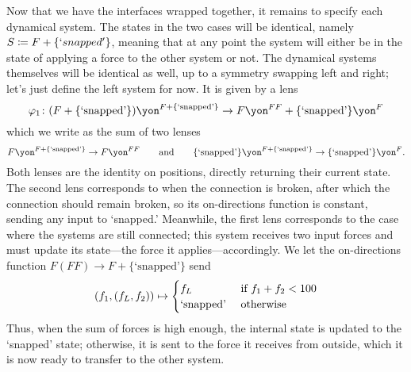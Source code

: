 \documentclass[Book-Poly]{subfiles}
\begin{document}
\begin{example}
Now that we have the interfaces wrapped together, it remains to specify each dynamical system.
The states in the two cases will be identical, namely $S\coloneqq F+\{`snapped'\}$, meaning that at any point the system will either be in the state of applying a force to the other system or not.
The dynamical systems themselves will be identical as well, up to a symmetry swapping left and right; let's just define the left system for now.
It is given by a lens
\[\varphi_1\colon (F+\{\text{`snapped'}\})\yon^{F+\{\text{`snapped'}\}}\to F\yon^{FF}+\{\text{`snapped'}\}\yon^F\]
which we write as the sum of two lenses
\[F\yon^{F+\{\text{`snapped'}\}}\to F\yon^{FF} \qqand \{\text{`snapped'}\}\yon^{F+\{\text{`snapped'}\}}\to\{\text{`snapped'}\}\yon^F.\]
Both lenses are the identity on positions, directly returning their current state.
The second lens corresponds to when the connection is broken, after which the connection should remain broken, so its on-directions function is constant, sending any input to `snapped.'
Meanwhile, the first lens corresponds to the case where the systems are still connected; this system receives two input forces and must update its state---the force it applies---accordingly.
We let the on-directions function $F(FF)\to F+\{\text{`snapped'}\}$ send
\[
(f_1,(f_L,f_2))\mapsto
\begin{cases}
	f_L&\textnormal{ if }f_1+f_2<100\\
	\text{`snapped'}&\textnormal{ otherwise}
\end{cases}
\]
Thus, when the sum of forces is high enough, the internal state is updated to the `snapped' state; otherwise, it is sent to the force it receives from outside, which it is now ready to transfer to the other system.
\end{example}
\end{document}

